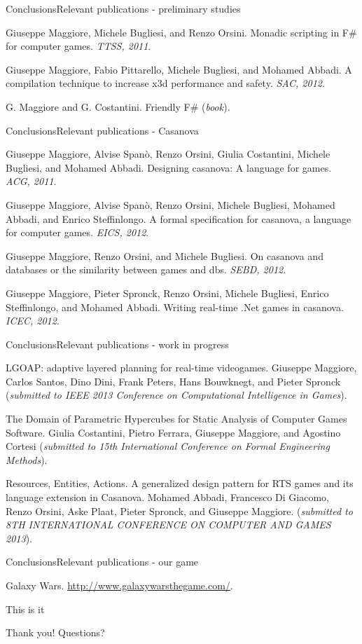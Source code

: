\documentclass{beamer}
\begin{document}
\begin{slide}{Conclusions}{Relevant publications - preliminary studies}{
\fontsize{6}{10}\selectfont
\item Giuseppe Maggiore, Michele Bugliesi, and Renzo Orsini. Monadic scripting in F\# for computer games. \textit{TTSS, 2011}.
\item Giuseppe Maggiore, Fabio Pittarello, Michele Bugliesi, and Mohamed Abbadi. A compilation technique to increase x3d performance and safety. \textit{SAC, 2012}.
\item G. Maggiore and G. Costantini. Friendly F\# (\textit{book}).
}\end{slide}

\begin{slide}{Conclusions}{Relevant publications - Casanova}{
\fontsize{6}{10}\selectfont
\item Giuseppe Maggiore, Alvise Spanò, Renzo Orsini, Giulia Costantini, Michele Bugliesi, and Mohamed Abbadi. Designing casanova: A language for games. \textit{ACG, 2011}.
\item Giuseppe Maggiore, Alvise Spanò, Renzo Orsini, Michele Bugliesi, Mohamed Abbadi, and Enrico Steffinlongo. A formal specification for casanova, a language for computer games. \textit{EICS, 2012}.
\item Giuseppe Maggiore, Renzo Orsini, and Michele Bugliesi. On casanova and databases or the similarity between games and dbs. \textit{SEBD, 2012}.
\item Giuseppe Maggiore, Pieter Spronck, Renzo Orsini, Michele Bugliesi, Enrico Steffinlongo, and Mohamed Abbadi. Writing real-time .Net games in casanova. \textit{ICEC, 2012}.
}\end{slide}

\begin{slide}{Conclusions}{Relevant publications - work in progress}{
\fontsize{6}{10}\selectfont
\item LGOAP: adaptive layered planning for real-time videogames. Giuseppe Maggiore, Carlos Santos, Dino Dini, Frank Peters, Hans Bouwknegt, and Pieter Spronck (\textit{submitted to IEEE 2013 Conference on Computational Intelligence in Games}).
\item The Domain of Parametric Hypercubes for Static Analysis of Computer Games Software. Giulia Costantini, Pietro Ferrara, Giuseppe Maggiore, and Agostino Cortesi (\textit{submitted to 15th International Conference on Formal Engineering Methods}).
\item Resources, Entities, Actions. A generalized design pattern for RTS games and its
  language extension in Casanova. Mohamed Abbadi, Francesco Di Giacomo, Renzo Orsini, Aske Plaat, Pieter Spronck, and Giuseppe Maggiore. (\textit{submitted to 8TH INTERNATIONAL CONFERENCE ON COMPUTER AND GAMES 2013}).
}\end{slide}

\begin{slide}{Conclusions}{Relevant publications - our game}{
\fontsize{6}{10}\selectfont
\item Galaxy Wars. \url{http://www.galaxywarsthegame.com/}.
}\end{slide}

\begin{frame}{This is it}
\begin{block}{Thank you!}
Questions?
\end{block}
\end{frame}
\end{document}
